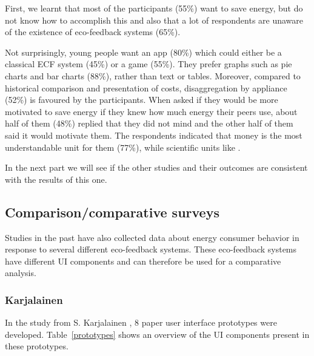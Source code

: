 \documentclass[journal]{vgtc}                %
\begin{document}
First, we learnt that most of the participants (55\%) want to save energy, but do not know how to accomplish this and also that a lot of respondents are unaware of the existence of eco-feedback systems (65\%).
 
Not surprisingly, young people want an app (80\%) which could either be a classical ECF system (45\%) or a game (55\%).
They prefer graphs such as pie charts and bar charts (88\%), rather than text or tables. 
Moreover, compared to historical comparison and presentation of costs, disaggregation by appliance (52\%) is favoured by the participants.
When asked if they would be more motivated to save energy if they knew how much energy their peers use, about half of them (48\%) replied that they did not mind and the other half of them said it would motivate them.
The respondents indicated that money is the most understandable unit for them (77\%), while scientific units like .

In the next part we will see if the other studies and their outcomes are consistent with the results of this one.



\subsection{Comparison/comparative surveys} %
Studies in the past have also collected data about energy consumer behavior in response to several different eco-feedback systems. These eco-feedback systems have different UI components and can therefore be used for a comparative analysis.

\subsubsection{Karjalainen}
In the study from S. Karjalainen \cite{karjalainen2011consumer}, 8 paper user interface prototypes were developed. Table~\ref{prototypes} shows an overview of the UI components present in these prototypes.
\end{document}
